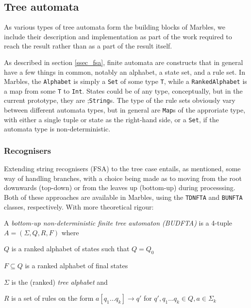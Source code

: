 \subsection{Tree automata}

As various types of tree automata form the building blocks of Marbles, we
include their description and implementation as part of the work required
to reach the result rather than as a part of the result itself.

As described in section \ref{ssec_fsa}, finite automata are constructs that
in general have a few things in common, notably an alphabet, a state set,
and a rule set. In Marbles, the \texttt{Alphabet} is simply a \texttt{Set}
of some type \texttt{T}, while a \texttt{RankedAlphabet} is a map from some 
\texttt{T} to \texttt{Int}. States could be of any type, conceptually, but
in the current prototype, they are ;\texttt{String}s. The type of the rule
sets obviously vary between different automata types, but in general are
\texttt{Map}s of the approriate type, with either a single tuple or state
as the right-hand side, or a \texttt{Set}, if the automata type is
non-deterministic.

\subsubsection{Recognisers}

Extending string recognisers (FSA) to the tree case entails, as mentioned,
some way of handling branches, with a choice being made as to moving from
the root downwards (top-down) or from the leaves up (bottom-up) during
processsing. Both of these approaches are available in Marbles, using the
\texttt{TDNFTA} and \texttt{BUNFTA} classes, respectively. With more
theoretical rigour:

A \emph{bottom-up non-deterministic finite tree automaton (BUDFTA)} is a
4-tuple $A = (\Sigma, Q, R, F)$ where
\begin{compactitem}
\item $Q$ is a ranked alphabet of states such that $Q = Q_0$
\item $F \subseteq Q$ is a ranked alphabet of final states
\item $\Sigma$ is the (ranked) \emph{tree alphabet} and
\item $R$ is a set of rules on the form
$a[q_1 \ldots q_k] \rightarrow q'$ for $q',q_1 \ldots q_k \in Q, a \in
\Sigma_k$
\end{compactitem}
\vspace{0.4cm}


